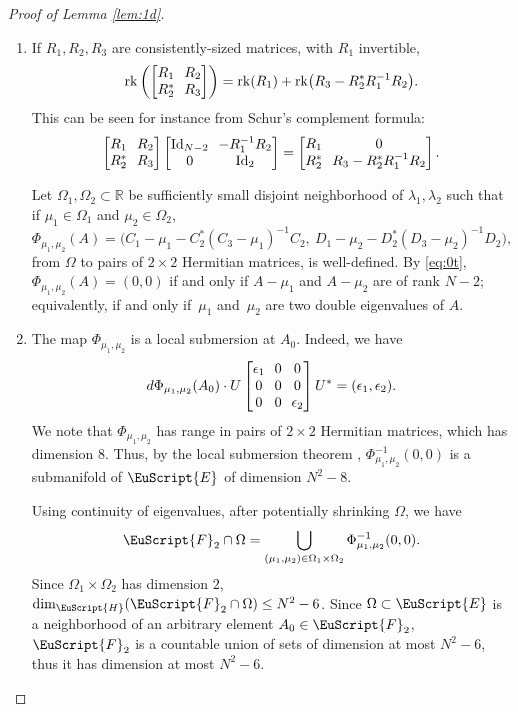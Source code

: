\documentclass[JEP,XML,SOM,Unicode,NoFloatCountersInSection]{cedram}
\let\pazocal\EuScript
\theoremstyle{definition}
\DeclareMathOperator{\Id}{Id}
\DeclareMathOperator{\rk}{rk}
\newcommand{\FF}{\pazocal{F}}
\newcommand{\EE}{\pazocal{E}}
\newcommand{\HH}{\pazocal{H}}
\newcommand{\R}{\mathbb{R}}
\newcommand{\matrice}[1]{\arraycolsep3.5pt\begin{bmatrix}#1\end{bmatrix}}
\begin{document}
\begin{proof}[Proof of Lemma \ref{lem:1d}]
\begin{enumerate}
\item
If $R_1, R_2, R_3$ are consistently-sized matrices, with $R_1$ invertible,
\begin{equation*}
\rk \left(\matrice{R_1 & R_2 \\ R_2^* & R_3} \right) = \rk(R_1)+ \rk \bigl(R_3-R_2^* R_1^{-1}R_2\bigr).
\end{equation*}
This can be seen for instance from Schur's complement formula:
\begin{equation}\label{eq:0t}
\matrice{R_1 & R_2 \\ R_2^* & R_3} \matrice{\Id_{N-2} & -R_1^{-1}R_2 \\ 0 & \Id_2 } = \matrice{R_1 & 0 \\ R_2^* & R_3-R_2^* R_1^{-1}R_2}.
\end{equation}

Let $\Omega_1, \Omega_2 \subset \R$ be sufficiently small disjoint neighborhood of $\lambda_1, \lambda_2$ such that if $\mu_1 \in \Omega_1$ and $\mu_2 \in \Omega_2$,
\begin{equation*}
\Phi_{\mu_1,\mu_2}(A) = \bigl( C_1 - \mu_1 - C_2^* (C_3-\mu_1)^{-1} C_2, \ D_1 - \mu_2 - D_2^* (D_3-\mu_2)^{-1} D_2 \bigr),
\end{equation*}
from $\Omega$ to pairs of $2 \times 2$ Hermitian matrices, is well-defined. By \eqref{eq:0t}, $\Phi_{\mu_1,\mu_2}(A) = (0,0)$ if and only if $A-\mu_1$ and $A - \mu_2$ are of rank $N-2$; equivalently, if and only if~$\mu_1$ and~$\mu_2$ are two double eigenvalues of $A$.

\item
The map $\Phi_{\mu_1,\mu_2}$ is a local submersion at $A_0$. Indeed, we have
\begin{equation*}
d\Phi_{\mu_1,\mu_2}(A_0) \cdot U \matrice{\epsilon_1 & 0 & 0 \\ 0 & 0 & 0 \\ 0 & 0 & \epsilon_2 }U^* = (\epsilon_1,\epsilon_2).
\end{equation*}
We note that $\Phi_{\mu_1,\mu_2}$ has range in pairs of $2 \times 2$ Hermitian matrices, which has dimension $8$. Thus, by the local submersion theorem \cite[\S4]{GP74}, $\Phi_{\mu_1,\mu_2}^{-1}(0,0)$ is a submanifold of $\EE$ of dimension $N^2-8$.

Using continuity of eigenvalues, after potentially shrinking $\Omega$, we have
\begin{equation*}
\FF_2 \cap \Omega = \bigcup_{(\mu_1,\mu_2) \in \Omega_1 \times \Omega_2} \Phi_{\mu_1,\mu_2}^{-1}(0,0).
\end{equation*}
Since $\Omega_1 \times \Omega_2$ has dimension $2$, $\dim_\HH(\FF_2 \cap \Omega) \leq N^2-6$. Since $\Omega \subset \EE$ is a neighborhood of an arbitrary element $A_0 \in \FF_2$, $\FF_2$ is a countable union of sets of dimension at most $N^2-6$, thus it has dimension at most $N^2-6$.\qedhere
\end{enumerate}
\end{proof}
\end{document}
